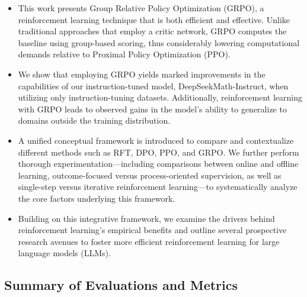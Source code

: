 \begin{itemize}[topsep=0pt]
    \item This work presents Group Relative Policy Optimization (GRPO), a reinforcement learning technique that is both efficient and effective. Unlike traditional approaches that employ a critic network, GRPO computes the baseline using group-based scoring, thus considerably lowering computational demands relative to Proximal Policy Optimization (PPO).
    \item We show that employing GRPO yields marked improvements in the capabilities of our instruction-tuned model, DeepSeekMath-Instruct, when utilizing only instruction-tuning datasets. Additionally, reinforcement learning with GRPO leads to observed gains in the model’s ability to generalize to domains outside the training distribution.
    \item A unified conceptual framework is introduced to compare and contextualize different methods such as RFT, DPO, PPO, and GRPO. We further perform thorough experimentation—including comparisons between online and offline learning, outcome-focused versus process-oriented supervision, as well as single-step versus iterative reinforcement learning—to systematically analyze the core factors underlying this framework.
    \item Building on this integrative framework, we examine the drivers behind reinforcement learning's empirical benefits and outline several prospective research avenues to foster more efficient reinforcement learning for large language models (LLMs).
\end{itemize}

\subsection{Summary of Evaluations and Metrics}

